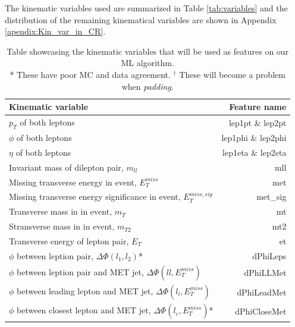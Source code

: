 \documentclass[14pt, a4paper]{book}
\begin{document}
\clearpage\noindent The kinematic variables used are summarized in Table \ref{tab:variables} and the distribution of the remaining kinematical variables are shown in Appendix \ref{apendix:Kin_var_in_CR}.
\begin{table}[!h]
    \centering
    \caption[Kinematic variables used as features]{Table showcasing the kinematic variables that will be used as features on our ML algorithm.\\ * These have poor MC and data agreement. $^\dagger$ These will become a problem when \textit{padding}.}
    \begin{tabular}{l|r}\midrule\midrule
        Kinematic variable                                                              & Feature name          \\\midrule
        $p_T$ of both leptons                                                           & lep1pt \& lep2pt      \\
        $\phi$ of both leptons                                                          & lep1phi \& lep2phi    \\
        $\eta$ of both leptons                                                          & lep1eta \& lep2eta    \\
        Invariant mass of dilepton pair, $m_{ll}$                                       & mll \\
        Missing transverse energy in event, $E_T^{miss}$                                & met \\
        Missing transverse energy significance in event, $E_T^{miss,sig}$               & met\_sig \\
        Transverse mass in in event, $m_T$                                              & mt \\
        Stransverse mass in in event, $m_{T2}$                                          & mt2\\
        Transverse energy of lepton pair, $E_T$                                         & et \\
        $\phi$ between leption pair, $\Delta\Phi(l_1,l_2)$*                             & dPhiLeps \\
        $\phi$ between leption pair and MET jet, $\Delta\Phi(ll,E_T^{miss})$            & dPhiLLMet \\
        $\phi$ between leading lepton and MET jet, $\Delta\Phi(l_l,E_T^{miss})$         & dPhiLeadMet \\
        $\phi$ between closest lepton and MET jet, $\Delta\Phi(l_c,E_T^{miss})$*        & dPhiCloseMet \\

\end{tabular}
\end{table}
\end{document}
